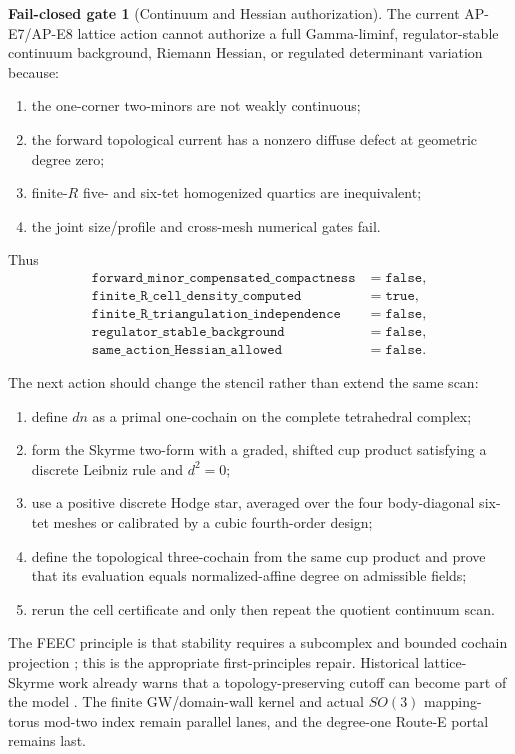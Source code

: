 \documentclass[11pt]{article}
\numberwithin{equation}{section}
\theoremstyle{definition}
\newtheorem{gate}[theorem]{Fail-closed gate}
\theoremstyle{remark}
\begin{document}
\begin{gate}[Continuum and Hessian authorization]
The current AP-E7/AP-E8 lattice action cannot authorize a full Gamma-liminf,
regulator-stable continuum background, Riemann Hessian, or regulated
determinant variation because:
\begin{enumerate}
\item the one-corner two-minors are not weakly continuous;
\item the forward topological current has a nonzero diffuse defect at
geometric degree zero;
\item finite-$R$ five- and six-tet homogenized quartics are inequivalent;
\item the joint size/profile and cross-mesh numerical gates fail.
\end{enumerate}
\end{gate}

Thus
\begin{align}
 \texttt{forward\_minor\_compensated\_compactness}&=\texttt{false},\\
 \texttt{finite\_R\_cell\_density\_computed}&=\texttt{true},\\
 \texttt{finite\_R\_triangulation\_independence}&=\texttt{false},\\
 \texttt{regulator\_stable\_background}&=\texttt{false},\\
 \texttt{same\_action\_Hessian\_allowed}&=\texttt{false}.
\end{align}

The next action should change the stencil rather than extend the same scan:
\begin{enumerate}
\item define $dn$ as a primal one-cochain on the complete tetrahedral complex;
\item form the Skyrme two-form with a graded, shifted cup product satisfying a
discrete Leibniz rule and $d^2=0$;
\item use a positive discrete Hodge star, averaged over the four body-diagonal
six-tet meshes or calibrated by a cubic fourth-order design;
\item define the topological three-cochain from the same cup product and prove
that its evaluation equals normalized-affine degree on admissible fields;
\item rerun the cell certificate and only then repeat the quotient continuum
scan.
\end{enumerate}
The FEEC principle is that stability requires a subcomplex and bounded
cochain projection \cite{ArnoldFalkWinther2010}; this is the appropriate
first-principles repair.  Historical lattice-Skyrme work already warns that a
topology-preserving cutoff can become part of the model
\cite{SchrammSvetitsky2000}.  The finite GW/domain-wall kernel and actual
$SO(3)$ mapping-torus mod-two index remain parallel lanes, and the degree-one
Route-E portal remains last.
\end{document}
